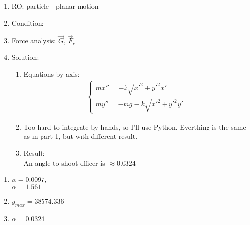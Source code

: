 \begin{enumerate}
    \item RO: particle - planar motion
    \item Condition:
          \begin{center}
          \end{center}
    \item Force analysis:
          $\vec{G}$, $\vec{F}_{c}$
    \item Solution:
          \begin{enumerate}
              \item Equations by axis:
                    \begin{align}
                        \begin{cases}
                            mx'' = -k \sqrt{x'^2 + y'^2} x' \\
                            my'' = -mg - k \sqrt{x'^2 + y'^2} y'
                        \end{cases}
                    \end{align}
              \item Too hard to integrate by hands, so I'll use Python.
                    Everthing is the same as in part 1, but with different result.
              \item Result: \\
                    An angle to shoot officer is $\approx 0.0324$
          \end{enumerate}
\end{enumerate}

\begin{answer}
    \begin{enumerate}
        \item
              $\alpha = 0.0097$, \\
              $\alpha = 1.561$
        \item
              $y_{max} = 38574.336$
        \item
              $\alpha = 0.0324$
    \end{enumerate}
\end{answer}